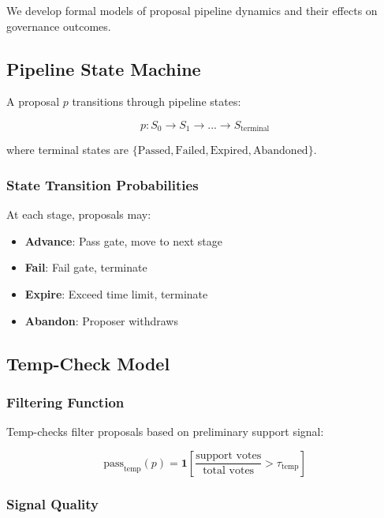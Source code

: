 
We develop formal models of proposal pipeline dynamics and their effects on governance outcomes.

\subsection{Pipeline State Machine}

A proposal $p$ transitions through pipeline states:

\begin{equation}
p: S_0 \rightarrow S_1 \rightarrow ... \rightarrow S_{\text{terminal}}
\end{equation}

where terminal states are $\{\text{Passed}, \text{Failed}, \text{Expired}, \text{Abandoned}\}$.

\subsubsection{State Transition Probabilities}

At each stage, proposals may:
\begin{itemize}
    \item \textbf{Advance}: Pass gate, move to next stage
    \item \textbf{Fail}: Fail gate, terminate
    \item \textbf{Expire}: Exceed time limit, terminate
    \item \textbf{Abandon}: Proposer withdraws
\end{itemize}

\subsection{Temp-Check Model}

\subsubsection{Filtering Function}

Temp-checks filter proposals based on preliminary support signal:

\begin{equation}
\text{pass}_{\text{temp}}(p) = \mathbf{1}\left[\frac{\text{support votes}}{\text{total votes}} > \tau_{\text{temp}}\right]
\end{equation}

\subsubsection{Signal Quality}


